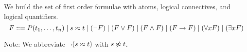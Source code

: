 
\begin{definition}\label{def:formula}
We build the set of first order formulae with atoms, logical connectives, and logical quantifiers.
%
\[
 F ::= P(t_1,\ldots,t_n) \mid
	s\approx t \mid
	(\lnot F) \mid 
	(F\lor F) \mid
	(F\land F) \mid
	(F\rightarrow F) \mid
	(\forall x F) \mid
	(\exists x F)
\]
\end{definition}

\noindent Note: We abbreviate $\lnot(s\approx t)$ with $s\not\approx t$.